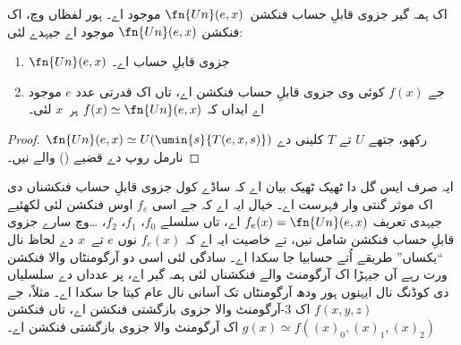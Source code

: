 \documentclass[../../../include/open-logic-section]{subfiles}
\begin{document}

\begin{thm}
اک ہمہ گیر جزوی قابلِ حساب فنکشن~$\fn{Un}(e,x)$ موجود اے۔
ہور لفظاں وچ، اک فنکشن $\fn{Un}(e,x)$ موجود اے جیہدے لئی:
\begin{enumerate}
\item $\fn{Un}(e,x)$ جزوی قابلِ حساب اے۔
\item جے $f(x)$ کوئی وی جزوی قابلِ حساب فنکشن اے، تاں
اک قدرتی عدد $e$ موجود اے ایداں کہ $f(x) \simeq \fn{Un}(e,x)$
ہر~$x$ لئی۔
\end{enumerate}
\end{thm}

\begin{proof}
$\fn{Un}(e,x) \simeq U(\umin{s}{T(e,x,s)})$ رکھو، جتھے $U$ تے
$T$ کلینی دے نارمل روپ دے قضیے ()
والے نیں۔
\end{proof}

\begin{explain}
ایہ صرف ایس گل دا ٹھیک ٹھیک بیان اے کہ ساڈے کول جزوی
قابلِ حساب فنکشناں دی اک موثر گنتی وار فہرست اے۔ خیال
ایہ اے کہ جے اسی $f_e$ اوس فنکشن لئی لکھئیے جیہدی تعریف
$f_e(x) = \fn{Un}(e,x)$ اے، تاں سلسلے $f_0$، $f_1$، $f_2$،
\dots وچ سارے جزوی قابلِ حساب فنکشن شامل نیں، تے خاصیت
ایہ اے کہ $f_e(x)$ نوں $e$ تے~$x$ دے لحاظ نال ``یکساں''
طریقے اُتے حسابیا جا سکدا اے۔ سادگی لئی اسی دو آرگومنٹاں
والا فنکشن ورت رہے آں جیہڑا اک آرگومنٹ والے فنکشناں لئی
ہمہ گیر اے، پر عدداں دے سلسلیاں دی کوڈنگ نال ایہنوں
ہور ودھ آرگومنٹاں تک آسانی نال عام کیتا جا سکدا اے۔
مثلاً، جے $f(x,y,z)$ اک $3$-آرگومنٹ والا جزوی بازگشتی
فنکشن اے، تاں فنکشن $g(x) \simeq f((x)_0, (x)_1, (x)_2)$
اک آرگومنٹ والا جزوی بازگشتی فنکشن اے۔
\end{explain}
\end{document}
